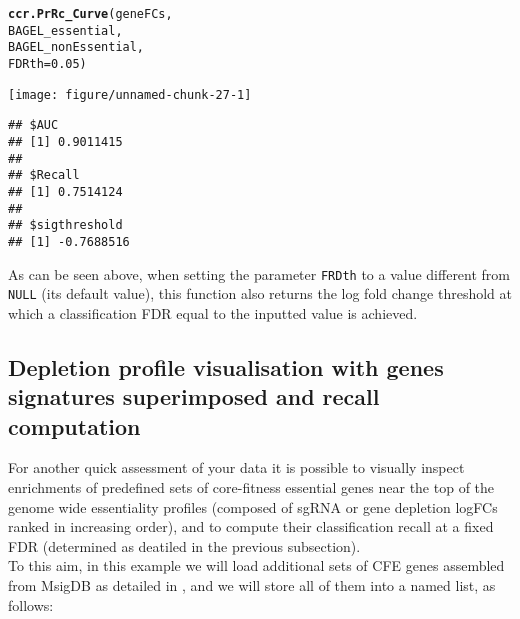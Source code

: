 \documentclass{article}\usepackage[]{graphicx}\usepackage[]{color}
\makeatletter
\def\maxwidth{ %
  \ifdim\Gin@nat@width>\linewidth
    \linewidth
  \else
    \Gin@nat@width
  \fi
}
\newcommand{\hlnum}[1]{\textcolor[rgb]{0.686,0.059,0.569}{#1}}%
\newcommand{\hlstd}[1]{\textcolor[rgb]{0.345,0.345,0.345}{#1}}%
\newcommand{\hlkwc}[1]{\textcolor[rgb]{0.333,0.667,0.333}{#1}}%
\newcommand{\hlkwd}[1]{\textcolor[rgb]{0.737,0.353,0.396}{\textbf{#1}}}%
\newenvironment{kframe}{%
 \def\at@end@of@kframe{}%
 \ifinner\ifhmode%
  \def\at@end@of@kframe{\end{minipage}}%
  \begin{minipage}{\columnwidth}%
 \fi\fi%
 \def\FrameCommand##1{\hskip\@totalleftmargin \hskip-\fboxsep
 \colorbox{shadecolor}{##1}\hskip-\fboxsep
     \hskip-\linewidth \hskip-\@totalleftmargin \hskip\columnwidth}%
 \MakeFramed {\advance\hsize-\width
   \@totalleftmargin\z@ \linewidth\hsize
   \@setminipage}}%
 {\par\unskip\endMakeFramed%
 \at@end@of@kframe}
\newenvironment{knitrout}{}{} %
\makeatother
\begin{document}
\begin{knitrout}
\color{fgcolor}\begin{kframe}
\begin{alltt}
\hlkwd{ccr.PrRc_Curve}\hlstd{(geneFCs,}
                         \hlstd{BAGEL_essential,}
                         \hlstd{BAGEL_nonEssential,}
                         \hlkwc{FDRth} \hlstd{=} \hlnum{0.05}\hlstd{)}
\end{alltt}
\end{kframe}
\texttt{[image: figure/unnamed-chunk-27-1]} 
\begin{kframe}\begin{verbatim}
## $AUC
## [1] 0.9011415
## 
## $Recall
## [1] 0.7514124
## 
## $sigthreshold
## [1] -0.7688516
\end{verbatim}
\end{kframe}
\end{knitrout}
  
 
As can be seen above, when setting the parameter \texttt{FRDth} to a value different from \texttt{NULL}
(its default value), this function also returns the log fold change threshold at which a classification FDR equal to the inputted value is achieved. 
 
\subsection{Depletion profile visualisation with genes signatures superimposed and recall computation}
For another quick assessment of your data it is possible to visually inspect enrichments of predefined sets of core-fitness essential genes near the top of the genome wide essentiality profiles (composed of sgRNA or gene depletion logFCs ranked in increasing order), and to compute their classification recall at a fixed FDR (determined as deatiled in the previous subsection).\\
 
To this aim, in this example we will load additional sets of CFE genes assembled from MsigDB \cite{Subramanian:2005wu} as detailed in \cite{Iorio:2017}, and we will store all of them into a named list, as follows:
\end{document}
